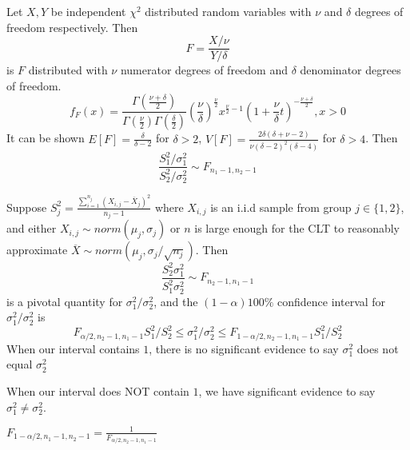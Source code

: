 \documentclass[12pt, a4paper, twoside, openright, titlepage]{book}
\begin{document}
\begin{rmk}{}{}
    Let $X,Y$ be independent $\chi^2$ distributed random variables with $\nu$ and $\delta$ degrees of freedom respectively. Then \begin{equation*}
        F= \frac{X/\nu}{Y/\delta}
    \end{equation*}
    is $F$ distributed with $\nu$ numerator degrees of freedom and $\delta$ denominator degrees of freedom. \begin{equation*}
        f_F(x) = \frac{\Gamma\left(\frac{\nu+\delta}{2}\right)}{\Gamma\left(\frac{\nu}{2}\right)\Gamma\left(\frac{\delta}{2}\right)}\left(\frac{\nu}{\delta}\right)^{\frac{\nu}{2}}x^{\frac{\nu}{2}-1}\left(1+\frac{\nu}{\delta}t\right)^{-\frac{\nu+\delta}{2}}, x > 0
    \end{equation*}
    It can be shown $E[F] = \frac{\delta}{\delta - 2}$ for $\delta > 2$, $V[F] = \frac{2\delta(\delta+\nu-2)}{\nu(\delta-2)^2(\delta-4)}$ for $\delta >4$. Then \begin{equation*}
        \frac{S_1^2/\sigma_1^2}{S_2^2/\sigma_2^2}\sim F_{n_1-1,n_2-1}
    \end{equation*}
\end{rmk}

\begin{rmk}{}{}
    Suppose $S_j^2 = \frac{\sum_{i=1}^{n_j}(X_{i,j}-\overline{X}_j)^2}{n_j-1}$ where $X_{i,j}$ is an i.i.d sample from group $j \in \{1,2\}$, and either $X_{i,j} 
    \sim norm(\mu_j,\sigma_j)$ or $n$ is large enough for the CLT to reasonably approximate $\overline{X} \sim norm(\mu_j,\sigma_j/\sqrt{n_j})$. Then \begin{equation*}
        \frac{S_2^2\sigma_1^2}{S_1^2\sigma_2^2} \sim F_{n_2-1,n_1-1}
    \end{equation*}
    is a pivotal quantity for $\sigma_1^2/\sigma_2^2$, and the $(1-\alpha)100\%$ confidence interval for $\sigma_1^2/\sigma_2^2$ is \begin{equation*}
        F_{\alpha/2,n_2-1,n_1-1}S_1^2/S_2^2 \leq \sigma_1^2/\sigma_2^2 \leq F_{1-\alpha/2,n_2-1,n_1-1}S_1^2/S_2^2
    \end{equation*}
    When our interval contains $1$, there is no significant evidence to say $\sigma_1^2$ does not equal $\sigma_2^2$


    When our interval does NOT contain $1$, we have significant evidence to say $\sigma_1^2 \neq \sigma_2^2$.
\end{rmk}

\begin{note}{}{}
    $F_{1-\alpha/2,n_1-1,n_2-1} = \frac{1}{F_{\alpha/2,n_2-1,n_1-1}}$
\end{note}
\end{document}
